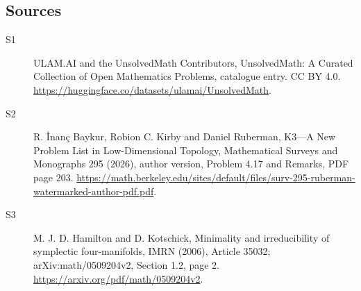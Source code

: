 \documentclass[11pt]{article}
\begin{document}
\subsection{Sources}
\begin{description}
\item[\hypertarget{source:statement:1}{S1}] ULAM.AI and the UnsolvedMath Contributors, UnsolvedMath: A Curated Collection of Open Mathematics Problems, catalogue entry. CC BY 4.0. \url{https://huggingface.co/datasets/ulamai/UnsolvedMath}.
\item[\hypertarget{source:statement:2}{S2}] R. İnanç Baykur, Robion C. Kirby and Daniel Ruberman, K3—A New Problem List in Low-Dimensional Topology, Mathematical Surveys and Monographs 295 (2026), author version, Problem 4.17 and Remarks, PDF page 203. \url{https://math.berkeley.edu/sites/default/files/surv-295-ruberman-watermarked-author-pdf.pdf}.
\item[\hypertarget{source:statement:3}{S3}] M. J. D. Hamilton and D. Kotschick, Minimality and irreducibility of symplectic four-manifolds, IMRN (2006), Article 35032; arXiv:math/0509204v2, Section 1.2, page 2. \url{https://arxiv.org/pdf/math/0509204v2}.
\end{description}
\label{end:statement}
\end{document}
